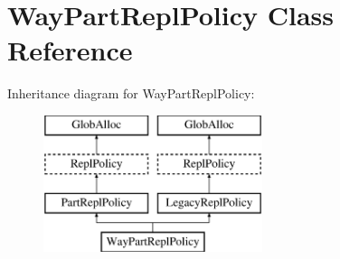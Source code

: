 \hypertarget{classWayPartReplPolicy}{\section{Way\-Part\-Repl\-Policy Class Reference}
\label{classWayPartReplPolicy}
}
Inheritance diagram for Way\-Part\-Repl\-Policy\-:\begin{figure}[H]
\begin{center}
\leavevmode
\includegraphics[height=4.000000cm]{classWayPartReplPolicy}
\end{center}
\end{figure}
